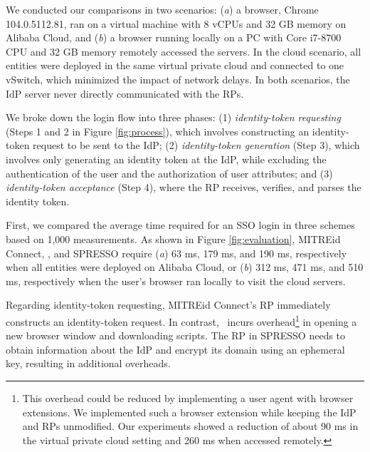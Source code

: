  We conducted our comparisons in two scenarios: (\emph{a}) a browser, Chrome 104.0.5112.81, ran on a virtual machine with 8 vCPUs and 32 GB memory on Alibaba Cloud, and (\emph{b}) a browser running locally on a PC with Core i7-8700 CPU and 32 GB memory remotely accessed the servers. In the cloud scenario, all entities were deployed in the same virtual private cloud and connected to one vSwitch, which minimized the impact of network delays. In both scenarios, the IdP server never directly communicated with the RPs.

We broke down the login flow into three phases: (1) 
{\em identity-token requesting} (Steps 1 and 2 in Figure \ref{fig:process}), which involves constructing an identity-token request to be sent to the IdP; (2) {\em identity-token generation} (Step 3), which involves only generating an identity token at the IdP, while excluding the authentication of the user and the authorization of user attributes; and (3) {\em identity-token acceptance} (Step 4), where the RP receives, verifies, and parses the identity token.


 First, we compared the average time required for an SSO login in three schemes based on 1,000 measurements. As shown in Figure \ref{fig:evaluation}, 
MITREid Connect, \usso, and SPRESSO require (\emph{a}) 63 ms, 179 ms, and 190 ms, respectively when all entities were deployed on Alibaba Cloud, or (\emph{b}) 312 ms, 471 ms, and 510 ms, respectively when the user's browser ran locally to visit the cloud servers. 

Regarding identity-token requesting, %
MITREid Connect's RP immediately constructs an identity-token request. %
In contrast, \usso~incurs overhead\footnote{This overhead could be reduced %
by implementing a user agent with browser extensions. 
We implemented such a browser extension while keeping the IdP and RPs unmodified. Our experiments showed a reduction of about 90 ms in the virtual private cloud setting and 260 ms when accessed remotely.} in opening a new browser window and downloading scripts. The RP in SPRESSO needs to obtain information about the IdP %
and encrypt its domain using an ephemeral key, resulting in additional overheads.

